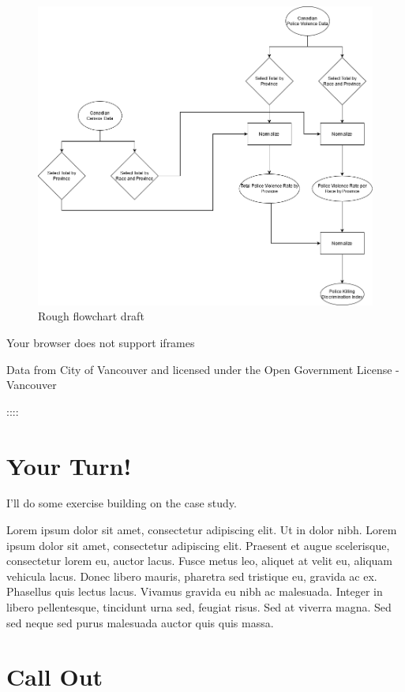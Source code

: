 \documentclass[
]{book}
\begin{document}
\begin{figure}
\centering
\includegraphics{images/03-police-violence.png}
\caption{Rough flowchart draft}
\end{figure}

Your browser does not support iframes

Data from City of Vancouver and licensed under the Open Government License - Vancouver

::::

\hypertarget{your-turn}{%
\section*{Your Turn!}\label{your-turn}}

I'll do some exercise building on the case study.

Lorem ipsum dolor sit amet, consectetur adipiscing elit. Ut in dolor nibh. Lorem ipsum dolor sit amet, consectetur adipiscing elit. Praesent et augue scelerisque, consectetur lorem eu, auctor lacus. Fusce metus leo, aliquet at velit eu, aliquam vehicula lacus. Donec libero mauris, pharetra sed tristique eu, gravida ac ex. Phasellus quis lectus lacus. Vivamus gravida eu nibh ac malesuada. Integer in libero pellentesque, tincidunt urna sed, feugiat risus. Sed at viverra magna. Sed sed neque sed purus malesuada auctor quis quis massa.

\hypertarget{call-out}{%
\section*{Call Out}\label{call-out}}
\end{document}
